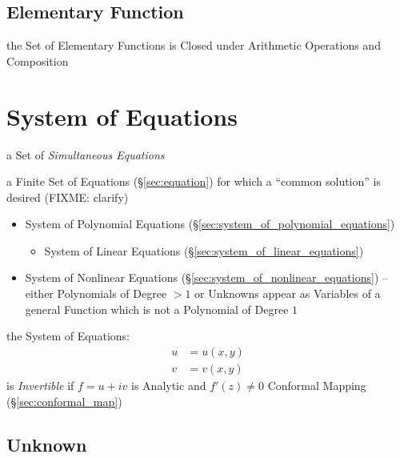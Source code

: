 \subsection{Elementary Function}\label{sec:elementary_function}

the Set of Elementary Functions is Closed under Arithmetic Operations and
Composition



\section{System of Equations}\label{sec:system_of_equations}

a Set of \emph{Simultaneous Equations}

a Finite Set of Equations (\S\ref{sec:equation}) for which a ``common
solution'' is desired (FIXME: clarify)

\begin{itemize}
  \item System of Polynomial Equations
    (\S\ref{sec:system_of_polynomial_equations})
  \begin{itemize}
    \item System of Linear Equations (\S\ref{sec:system_of_linear_equations})
  \end{itemize}
  \item System of Nonlinear Equations
    (\S\ref{sec:system_of_nonlinear_equations}) -- either Polynomials of Degree
    $>1$ or Unknowns appear as Variables of a general Function which is not a
    Polynomial of Degree $1$
\end{itemize}


the System of Equations:
\begin{align*}
  u & = u(x,y) \\
  v & = v(x,y)
\end{align*}
is \emph{Invertible} if $f = u + iv$ is Analytic and $f'(z) \neq 0$ \fist
Conformal Mapping (\S\ref{sec:conformal_map})



\subsection{Unknown}\label{sec:unknown}

